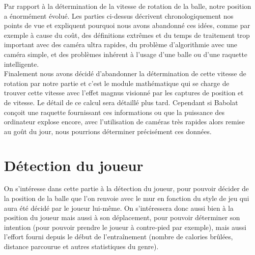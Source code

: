 Par rapport à la détermination de la vitesse de rotation de la balle, notre position a énormément évolué. Les parties ci-dessus décrivent chronologiquement nos points de vue et expliquent pourquoi nous avons abandonné ces idées, comme par exemple à cause du coût, des définitions extrêmes et du temps de traitement trop important avec des caméra ultra rapides, du problème d'algorithmie avec une caméra simple, et des problèmes inhérent à l'usage d'une balle ou d'une raquette intelligente.\\

Finalement nous avons décidé d'abandonner la détermination de cette vitesse de rotation par notre partie et c'est le module mathématique qui se charge de trouver cette vitesse avec l'effet magnus visionné par les captures de position et de vitesse. Le détail de ce calcul sera détaillé plus tard. Cependant si Babolat conçoit une raquette fournissant ces informations ou que la puissance des ordinateur explose encore, avec l'utilisation de caméras très rapides alors remise au goût du jour, nous pourrions déterminer précisément ces données.































\chapter{Détection du joueur}

On s'intéresse dans cette partie à la détection du joueur, pour pouvoir décider de la position de la balle que l'on renvoie avec le mur en fonction du style de jeu qui aura été décidé par le joueur lui-même. On s'intéressera donc aussi bien à la position du joueur mais aussi à son déplacement, pour pouvoir déterminer son intention (pour pouvoir prendre le joueur à contre-pied par exemple), mais aussi l'effort fourni depuis le début de l'entraînement (nombre de calories brûlées, distance parcourue et autres statistiques du genre). \\

